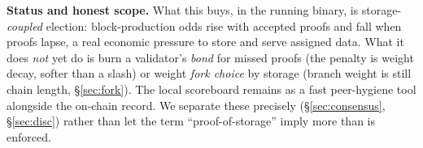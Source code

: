 \textbf{Status and honest scope.} What this buys, in the running binary, is storage-\emph{coupled}
election: block-production odds rise with accepted proofs and fall when proofs lapse, a real
economic pressure to store and serve assigned data. What it does \emph{not} yet do is burn a
validator's \emph{bond} for missed proofs (the penalty is weight decay, softer than a slash) or
weight \emph{fork choice} by storage (branch weight is still chain length, \S\ref{sec:fork}). The
local scoreboard remains as a fast peer-hygiene tool alongside the on-chain record. We separate
these precisely (\S\ref{sec:consensus}, \S\ref{sec:disc}) rather than let the term
``proof-of-storage'' imply more than is enforced.
